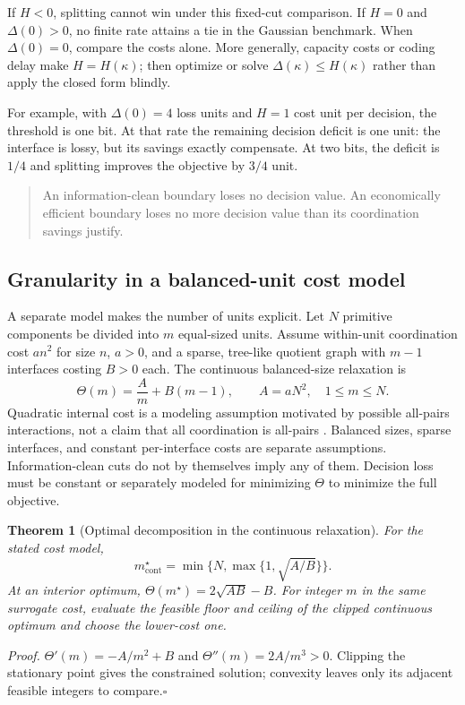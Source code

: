 \documentclass[11pt]{article}
\newtheorem{theorem}{Theorem}
\begin{document}
If $H<0$, splitting cannot win under this fixed-cut comparison. If $H=0$
and $\Delta(0)>0$, no finite rate attains a tie in the Gaussian benchmark.
When $\Delta(0)=0$, compare the costs alone. More generally, capacity costs
or coding delay make $H=H(\kappa)$; then optimize or solve
$\Delta(\kappa)\leq H(\kappa)$ rather than apply the closed form blindly.

For example, with $\Delta(0)=4$ loss units and $H=1$ cost unit per decision,
the threshold is one bit. At that rate the remaining decision deficit is one
unit: the interface is lossy, but its savings exactly compensate. At two bits,
the deficit is $1/4$ and splitting improves the objective by $3/4$ unit.

\begin{quote}
An information-clean boundary loses no decision value. An economically
efficient boundary loses no more decision value than its coordination
savings justify.
\end{quote}

\subsection{Granularity in a balanced-unit cost model}

A separate model makes the number of units explicit. Let $N$ primitive
components be divided into $m$ equal-sized units. Assume within-unit
coordination cost $a n^2$ for size $n$, $a>0$, and a sparse, tree-like
quotient graph with $m-1$ interfaces costing $B>0$ each. The continuous
balanced-size relaxation is
\[
\Theta(m)=\frac{A}{m}+B(m-1),\qquad
A=aN^2,\quad 1\leq m\leq N.
\]
Quadratic internal cost is a modeling assumption motivated by possible
all-pairs interactions, not a claim that all coordination is all-pairs
\cite{brooks1975,simon1962}. Balanced sizes, sparse interfaces, and constant
per-interface costs are separate assumptions. Information-clean cuts do not
by themselves imply any of them. Decision loss must be constant or separately
modeled for minimizing $\Theta$ to minimize the full objective.

\begin{theorem}[Optimal decomposition in the continuous relaxation]
\label{thm:granularity}
For the stated cost model,
\[
m^\star_{\mathrm{cont}}=
\min\{N,\max\{1,\sqrt{A/B}\}\}.
\]
At an interior optimum, $\Theta(m^\star)=2\sqrt{AB}-B$.
For integer $m$ in the same surrogate cost, evaluate the feasible floor and
ceiling of the clipped continuous optimum and choose the lower-cost one.
\end{theorem}
\noindent\textit{Proof.}
$\Theta'(m)=-A/m^2+B$ and $\Theta''(m)=2A/m^3>0$.
Clipping the stationary point gives the constrained solution; convexity leaves
only its adjacent feasible integers to compare.\hfill$\square$
\end{document}
